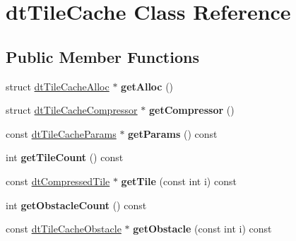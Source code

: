 \hypertarget{classdtTileCache}{}\section{dt\+Tile\+Cache Class Reference}
\label{classdtTileCache}
\subsection*{Public Member Functions}
\begin{DoxyCompactItemize}
\item 
\mbox{\label{classdtTileCache_adc396e35c754ef44cadea9cd113b7440}} 
struct \hyperlink{structdtTileCacheAlloc}{dt\+Tile\+Cache\+Alloc} $\ast$ {\bfseries get\+Alloc} ()
\item 
\mbox{\label{classdtTileCache_a14aed84748e8c2b3c1ce827342ca16f1}} 
struct \hyperlink{structdtTileCacheCompressor}{dt\+Tile\+Cache\+Compressor} $\ast$ {\bfseries get\+Compressor} ()
\item 
\mbox{\label{classdtTileCache_addea8bf2f66682e00c45a6948de77084}} 
const \hyperlink{structdtTileCacheParams}{dt\+Tile\+Cache\+Params} $\ast$ {\bfseries get\+Params} () const
\item 
\mbox{\label{classdtTileCache_af97fdd9fe05fa93455a203c5dd927df6}} 
int {\bfseries get\+Tile\+Count} () const
\item 
\mbox{\label{classdtTileCache_abc5a037f106bae848fee5faad7cbc389}} 
const \hyperlink{structdtCompressedTile}{dt\+Compressed\+Tile} $\ast$ {\bfseries get\+Tile} (const int i) const
\item 
\mbox{\label{classdtTileCache_a7f76bec4205d0f8a2a78683dd8766ea9}} 
int {\bfseries get\+Obstacle\+Count} () const
\item 
\mbox{\label{classdtTileCache_a5c447f013845eeb64d65a58085dee5b7}} 
const \hyperlink{structdtTileCacheObstacle}{dt\+Tile\+Cache\+Obstacle} $\ast$ {\bfseries get\+Obstacle} (const int i) const
\item 
\mbox{\label{classdtTileCache_a6aaf88b2bb53c59d8a57d1b95eba8ce9}} 

\end{DoxyCompactItemize}
